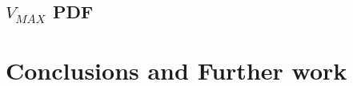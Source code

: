 \documentclass[9pt]{memoir}
\begin{document}
\section{$V_{MAX}$ PDF}
\label{sec:vmax}



\chapter{Conclusions and Further work}




\end{document}
